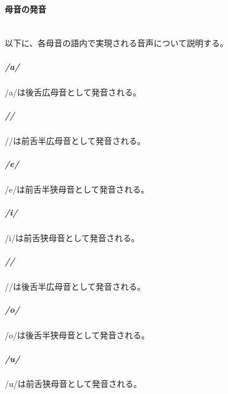\paragraph{母音の発音}\quad\\
以下に、各母音の語内で実現される音声について説明する。

\subparagraph{/a/}
/a/は後舌広母音\textipa{[A]}として発音される。

\subparagraph{//}
//は前舌半広母音\textipa{[E]}として発音される。

\subparagraph{/e/}
/e/は前舌半狭母音\textipa{[e]}として発音される。

\subparagraph{/i/}
/i/は前舌狭母音\textipa{[i]}として発音される。

\subparagraph{//}
//は後舌半広母音\textipa{[O]}として発音される。

\subparagraph{/o/}
/o/は後舌半狭母音\textipa{[o]}として発音される。

\subparagraph{/u/}
/u/は前舌狭母音\textipa{[u]}として発音される。

